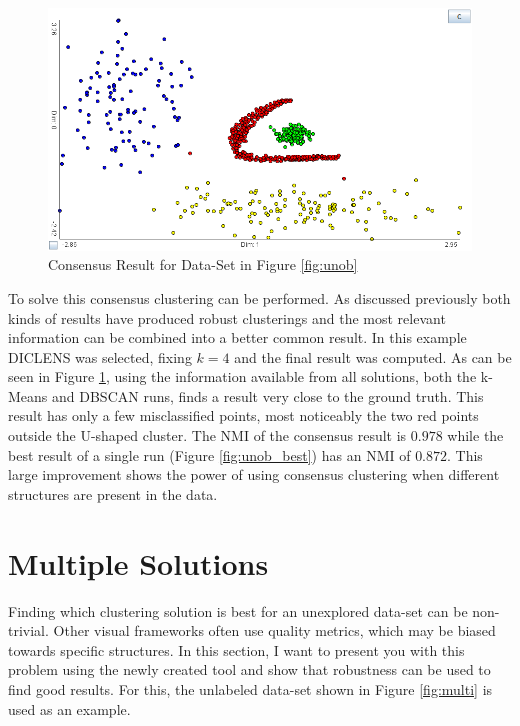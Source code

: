\documentclass[
	a4paper,
	english,
	twoside,
	openright,               
	11pt                            
	]{report}
\begin{document}
\begin{figure}[h]
	\centering
	\includegraphics[scale=.4]{unob_consensus}
	\caption{Consensus Result for Data-Set in Figure \ref{fig:unob}}
	\label{fig:unob_consensus}
\end{figure}

To solve this consensus clustering can be performed. As discussed previously both kinds of results have produced robust clusterings and the most relevant information can be combined into a better common result. In this example DICLENS was selected, fixing $k=4$ and the final result was computed. As can be seen in Figure \ref{fig:unob_consensus}, using the information available from all solutions, both the k-Means and DBSCAN runs, finds a result very close to the ground truth. This result has only a few misclassified points, most noticeably the two red points outside the U-shaped cluster. The NMI of the consensus result is $0.978$ while the best result of a single run (Figure \ref{fig:unob_best}) has an NMI of $0.872$. This large improvement shows the power of using consensus clustering when different structures are present in the data.


\section{Multiple Solutions}\label{sec:multi_sol}
Finding which clustering solution is best for an unexplored data-set can be non-trivial. Other visual frameworks often use quality metrics, which may be biased towards specific structures. In this section, I want to present you with this problem using the newly created tool and show that robustness can be used to find good results. For this, the unlabeled data-set shown in Figure \ref{fig:multi} is used as an example.
\end{document}
